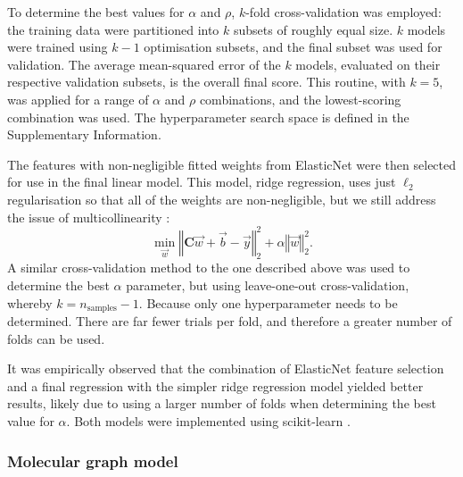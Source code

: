 To determine the best values for $\alpha$ and $\rho$, $k$-fold cross-validation was employed: the training data were partitioned into $k$ subsets of roughly equal size. $k$ models were trained using $k-1$ optimisation subsets, and the final subset was used for
validation. The average mean-squared error of the $k$ models, evaluated on their respective validation subsets, is the overall final score. This routine, with $k=5$, was applied for a range of $\alpha$ and $\rho$ combinations, and the
lowest-scoring combination was used. The hyperparameter search space is defined in the Supplementary Information.

The features with non-negligible fitted weights from ElasticNet were then selected for use in the final linear model. This model, ridge regression, uses just $\ell_2$ regularisation so that all of the weights are non-negligible, but we
still address the issue of multicollinearity \cite{mcdonaldRidgeRegression2009}:
\begin{equation}
    \min_{\vec{w}} \left \Vert \mathbf{C} \vec{w} + \vec{b} - \vec{y} \right \Vert_2^2 + \alpha \left \Vert \vec{w}\right \Vert_2^2.
\end{equation}
A similar cross-validation method to the one described above was used to determine the best $\alpha$ parameter, but using leave-one-out cross-validation, whereby $k=n_\text{samples}-1$. Because only one hyperparameter needs to be determined. There are far fewer trials per
fold, and therefore a greater number of folds can be used.

It was empirically observed that the combination of ElasticNet feature selection and a final regression with the simpler ridge regression model yielded better results, likely due to using a larger number of folds when determining the best value for $\alpha$. Both models were implemented using scikit-learn \cite{pedregosaScikitlearnMachineLearning2011}.

\subsubsection{Molecular graph model}

